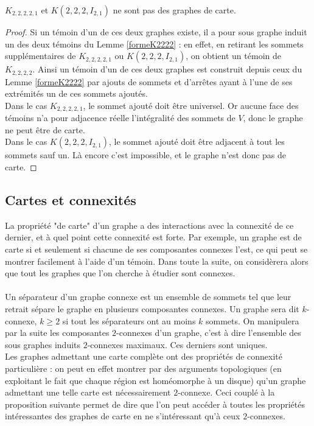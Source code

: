 \documentclass{scrartcl}
\begin{document}
\begin{flushleft}
\begin{prop}\label{K22221}
    $K_{2,2,2,2,1}$ et $K(2,2,2,I_{2,1})$ ne sont pas des graphes de carte.
\end{prop}

\begin{proof}
    Si un témoin d'un de ces deux graphes existe, il a pour sous graphe induit un des deux témoins du Lemme \ref{formeK2222} :
    en effet, en retirant les sommets supplémentaires de $K_{2,2,2,2,1}$ ou $K(2,2,2,I_{2,1})$, on obtient un témoin de
    $K_{2,2,2,2}$. Ainsi un témoin d'un de ces deux graphes est construit depuis ceux du Lemme \ref{formeK2222} par ajouts
    de sommets et d'arrêtes ayant à l'une de ses extrémités un de ces sommets ajoutés.\\
    Dans le cas $K_{2,2,2,2,1}$, le sommet ajouté doit être universel. Or aucune face des témoins n'a pour adjacence réelle
    l'intégralité des sommets de $V$, donc le graphe ne peut être de carte.\\
    Dans le cas $K(2,2,2,I_{2,1})$, le sommet ajouté doit être adjacent à tout les sommets sauf un. Là encore c'est impossible, et le
    graphe n'est donc pas de carte.
\end{proof}


\subsection{Cartes et connexités}\label{cartesetconnex}

La propriété "de carte" d'un graphe a des interactions avec la connexité de ce dernier, et à quel point cette connexité
est forte. Par exemple, un graphe est de carte si et seulement si chacune de ses composantes connexes l'est, ce qui peut se montrer
facilement à l'aide d'un témoin. Dans toute la suite, on considèrera alors que tout les graphes que l'on cherche à étudier sont connexes.
\\~\\
Un séparateur d'un graphe connexe est un ensemble de sommets tel que leur retrait sépare le graphe en plusieurs composantes connexes.
Un graphe sera dit $k$-connexe, $k \geq 2$ si tout les séparateurs ont au moins $k$ sommets. On manipulera par la suite
les composantes $2$-connexes d'un graphe, c'est à dire l'ensemble des sous graphes induits $2$-connexes maximaux. Ces derniers
sont uniques.\\
Les graphes admettant une carte complète ont des propriétés de connexité particulière : on peut en effet montrer par des arguments
topologiques (en exploitant le fait que chaque région est homéomorphe à un disque) qu'un graphe admettant une telle carte
est nécessairement $2$-connexe. Ceci couplé à la proposition suivante permet de dire que l'on peut accéder à toutes les propriétés
intéressantes des graphes de carte en ne s'intéressant qu'à ceux $2$-connexes.


\end{flushleft}
\end{document}
